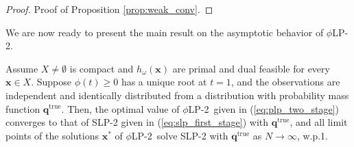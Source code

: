 \documentclass[opre,nonblindrev]{informs3} %
\renewcommand{\P}{\mathbb{P}}
\newcommand{\x}{\mathbf{x}}
\newcommand{\q}{\mathbf{q}}
\newcommand{\qtrue}{\q^{\text{true}}}
\newcommand{\plp}{$\phi$LP-2}
\begin{document}
\begin{proof}{\sc Proof of Proposition \ref{prop:weak_conv}.}
%	
	\Halmos
% 
%
%
%
%
%
\end{proof}

We are now ready to present the main result on the asymptotic behavior of \plp. 


\begin{theorem}
	\label{thm:epiconvergence}
	Assume $X \neq \emptyset$ is compact and $h_\omega(\x)$ are primal and dual feasible for every $\x \in X$.
	Suppose $\phi(t) \geq 0$ has a unique root at $t = 1$, and the observations are independent and identically distributed from a distribution with probability mass function $\qtrue$. 
	Then, the optimal value of \plp\ given in (\ref{eq:plp_two_stage}) converges to that of SLP-2 given in (\ref{eq:slp_first_stage}) with $\qtrue$, and all limit points of the solutions $\x^*$ of \plp\ solve SLP-2 with $\qtrue$ as $N \rightarrow \infty$, w.p.1.
\end{theorem}
\end{document}
